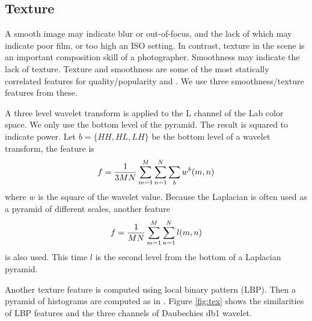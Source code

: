\documentclass[conference,a4paper]{IEEEtran}
\begin{document}
  \subsection{Texture}
  A smooth image may indicate blur or out-of-focus, and the lack of which may indicate poor film, or too high an ISO setting.  In contrast, texture in the scene is an important composition skill of a photographer.  Smoothness may indicate the lack of texture.  Texture and smoothness are some of the most statically correlated features for quality/popularity \cite{wang2015automatic} and \cite{khosla2014makes}.  We use three smoothness/texture features from these.

  A three level wavelet transform is applied to the L channel of the Lab color space.  We only use the bottom level of the pyramid.  The result is squared to indicate power.  Let $b = \{HH, HL, LH\}$ be the bottom level of a wavelet transform, the feature is
  \begin{equation}
    f = {1\over 3MN} \sum_{m=1}^{M}\sum_{n=1}^{N}\sum_{b}w^b(m, n)
  \end{equation}
  where $w$ is the square of the wavelet value.  Because the Laplacian is often used as a pyramid of different scales, another feature
  \begin{equation}
    f = {1\over MN} \sum_{m=1}^{M}\sum_{n=1}^{N}l(m, n)
  \end{equation} is also used.  This time $l$ is the second level from the bottom of a Laplacian pyramid.

  Another texture feature is computed using local binary pattern (LBP).  Then a pyramid of histograms are computed as in \cite{lazebnik2006beyond}.  Figure \ref{fig:tex} shows the similarities of LBP features and the three channels of Daubechies db1 wavelet.
\end{document}
